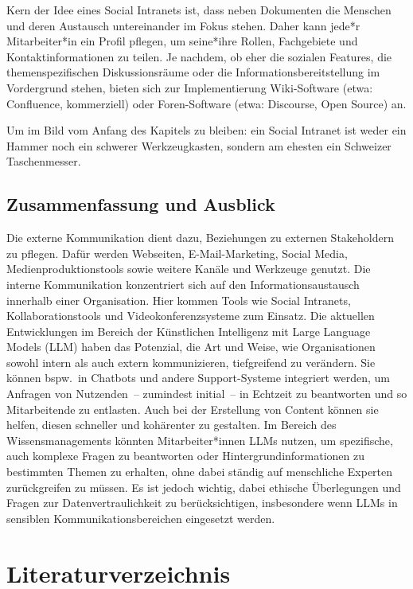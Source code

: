 \documentclass[
  11pt,
  letterpaper,
  DIV=11,
  twoside]{scrreprt}
\begin{document}
Kern der Idee eines Social Intranets ist, dass neben Dokumenten die
Menschen und deren Austausch untereinander im Fokus stehen. Daher kann
jede*r Mitarbeiter*in ein Profil pflegen, um seine*ihre Rollen,
Fachgebiete und Kontaktinformationen zu teilen. Je nachdem, ob eher die
sozialen Features, die themenspezifischen Diskussionsräume oder die
Informationsbereitstellung im Vordergrund stehen, bieten sich zur
Implementierung Wiki-Software (etwa: Confluence, kommerziell) oder
Foren-Software (etwa: Discourse, Open Source) an.

Um im Bild vom Anfang des Kapitels zu bleiben: ein Social Intranet ist
weder ein Hammer noch ein schwerer Werkzeugkasten, sondern am ehesten
ein Schweizer Taschenmesser.

\section{Zusammenfassung und
Ausblick}\label{zusammenfassung-und-ausblick-6}

Die externe Kommunikation dient dazu, Beziehungen zu externen
Stakeholdern zu pflegen. Dafür werden Webseiten, E-Mail-Marketing,
Social Media, Medienproduktionstools sowie weitere Kanäle und Werkzeuge
genutzt. Die interne Kommunikation konzentriert sich auf den
Informationsaustausch innerhalb einer Organisation. Hier kommen Tools
wie Social Intranets, Kollaborationstools und Videokonferenzsysteme zum
Einsatz. Die aktuellen Entwicklungen im Bereich der Künstlichen
Intelligenz mit Large Language Models ({LLM}) haben das Potenzial, die
Art und Weise, wie Organisationen sowohl intern als auch extern
kommunizieren, tiefgreifend zu verändern. Sie können bspw.~in Chatbots
und andere Support-Systeme integriert werden, um Anfragen von
Nutzenden~-- zumindest initial~-- in Echtzeit zu beantworten und so
Mitarbeitende zu entlasten. Auch bei der Erstellung von Content können
sie helfen, diesen schneller und kohärenter zu gestalten. Im Bereich des
Wissensmanagements könnten Mitarbeiter*innen LLMs nutzen, um
spezifische, auch komplexe Fragen zu beantworten oder
Hintergrundinformationen zu bestimmten Themen zu erhalten, ohne dabei
ständig auf menschliche Experten zurückgreifen zu müssen. Es ist jedoch
wichtig, dabei ethische Überlegungen und Fragen zur Datenvertraulichkeit
zu berücksichtigen, insbesondere wenn LLMs in sensiblen
Kommunikationsbereichen eingesetzt werden.


\chapter{Literaturverzeichnis}\label{sec-literatur}
\end{document}
